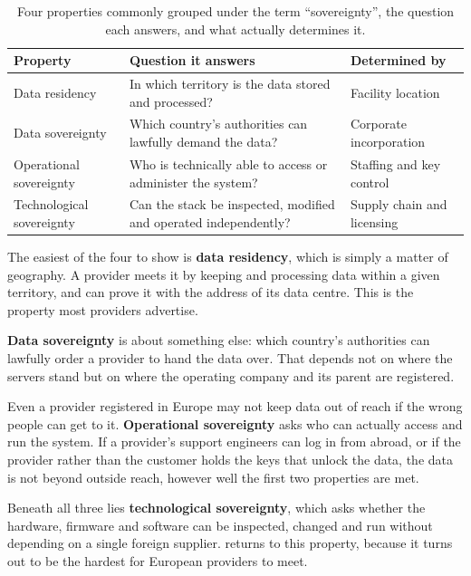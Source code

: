 \begin{table}[htbp]
  \centering
  \caption{Four properties commonly grouped under the term
           \enquote{sovereignty}, the question each answers, and what actually
           determines it.}
  \label{tab:sovereignty-dimensions}
  \small
  \begin{tabularx}{\textwidth}{@{}l X l@{}}
    \toprule
    \textbf{Property} & \textbf{Question it answers} & \textbf{Determined by} \\
    \midrule
    Data residency
      & In which territory is the data stored and processed?
      & Facility location \\[0.4em]
    Data sovereignty
      & Which country's authorities can lawfully demand the data?
      & Corporate incorporation \\[0.4em]
    Operational sovereignty
      & Who is technically able to access or administer the system?
      & Staffing and key control \\[0.4em]
    Technological sovereignty
      & Can the stack be inspected, modified and operated independently?
      & Supply chain and licensing \\
    \bottomrule
  \end{tabularx}
\end{table}

The easiest of the four to show is \textbf{data residency}, which is simply a
matter of geography. A provider meets it by keeping and processing data within a
given territory, and can prove it with the address of its data centre. This is the
property most providers advertise.

\textbf{Data sovereignty} is about something else: which country's authorities can
lawfully order a provider to hand the data over. That depends not on where the
servers stand but on where the operating company and its parent are registered.

Even a provider registered in Europe may not keep data out of reach if the wrong
people can get to it. \textbf{Operational sovereignty} asks who can actually
access and run the system. If a provider's support engineers can log in from
abroad, or if the provider rather than the customer holds the keys that unlock the
data, the data is not beyond outside reach, however well the first two properties
are met.

Beneath all three lies \textbf{technological sovereignty}, which asks whether the
hardware, firmware and software can be inspected, changed and run without
depending on a single foreign supplier.  returns to this
property, because it turns out to be the hardest for European providers to meet.

